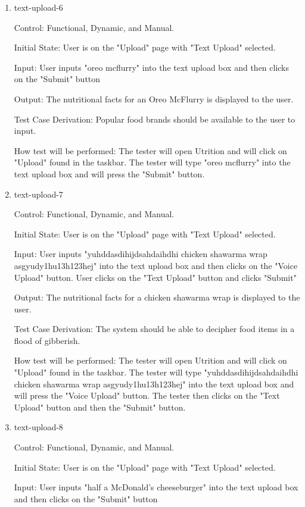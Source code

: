 \documentclass[12pt, titlepage]{article}
\begin{document}
\begin{enumerate}
	\item{text-upload-6\\}
	
	Control: Functional, Dynamic, and Manual.
	
	Initial State: User is on the "Upload" page with "Text Upload" selected.
	
	Input: User inputs "oreo mcflurry" into the text upload box and then clicks on the "Submit" button
	
	Output: The nutritional facts for an Oreo McFlurry is displayed to the user.
	
	Test Case Derivation: Popular food brands should be available to the user to input.
	
	How test will be performed: The tester will open Utrition and will click on "Upload" found in the taskbar. The tester will type "oreo mcflurry" into the text upload box and will press the "Submit" button.
	
	\item{text-upload-7\\}
	
	Control: Functional, Dynamic, and Manual.
	
	Initial State: User is on the "Upload" page with "Text Upload" selected.
	
	Input: User inputs "yuhddasdihijdsahdaihdhi chicken shawarma wrap asgyudy1hu13h123hej" into the text upload box and then clicks on the "Voice Upload" button. User clicks on the "Text Upload" button and clicks "Submit"
	
	Output: The nutritional facts for a chicken shawarma wrap is displayed to the user.
	
	Test Case Derivation: The system should be able to decipher food items in a flood of gibberish.
	
	How test will be performed: The tester will open Utrition and will click on "Upload" found in the taskbar. The tester will type "yuhddasdihijdsahdaihdhi chicken shawarma wrap asgyudy1hu13h123hej" into the text upload box and will press the "Voice Upload" button. The tester then clicks on the "Text Upload" button and then the "Submit" button.
	
	\item{text-upload-8\\}
	
	Control: Functional, Dynamic, and Manual.
	
	Initial State: User is on the "Upload" page with "Text Upload" selected.
	
	Input: User inputs "half a McDonald's cheeseburger" into the text upload box and then clicks on the "Submit" button
	

\end{enumerate}
\end{document}
